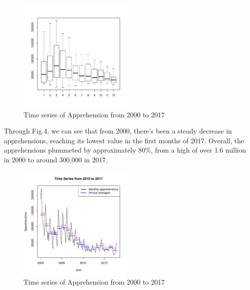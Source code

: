 \documentclass[journal, a4paper]{IEEEtran}
\begin{document}
\begin{figure}[!hbt]
  \begin{center}

{

  \includegraphics[width=0.5\textwidth]{pdf_template3-fig4}
  \caption{Time series of Apprehension from 2000 to 2017}
}

  \end{center}
\end{figure} 

Through Fig.4, we can see that from 2000, there's been a steady decrease in apprehensions, reaching its lowest value in  the first months of 2017. Overall, the apprehensions plummeted by approximately 80\%, from a high of over 1.6 million in 2000 to around 300,000 in 2017.
\begin{figure}[!hbt]
  \begin{center}

{

  \includegraphics[width=0.5\textwidth]{pdf_template3-fig3}
  \caption{Time series of Apprehension from 2000 to 2017}
}

  \end{center}
\end{figure} 
\end{document}
